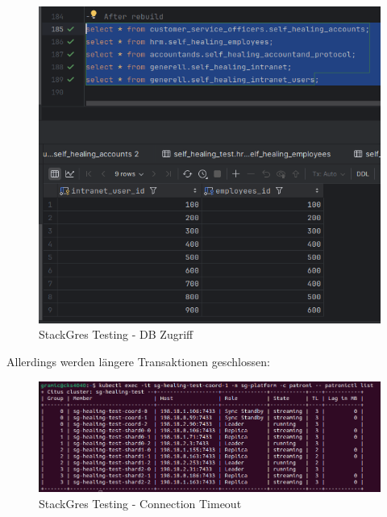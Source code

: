 \begin{flushleft}
\begin{figure}[H]
        \includegraphics[width=0.5\linewidth]{source/appendix/evaluation_testing/stackgres_node_down_access_possible}
        \caption{StackGres Testing - DB Zugriff}
        \label{fig:stackgres_node_down_access_possible}
    \end{figure}
    Allerdings werden längere Transaktionen geschlossen:
    \begin{figure}[H]
        \centering
        \includegraphics[width=0.5\linewidth]{source/appendix/evaluation_testing/stackgres_citus_connection_timeout}
        \caption{StackGres Testing - Connection Timeout}
        \label{fig:stackgres_citus_connection_timeout}
    \end{figure}
\end{flushleft}